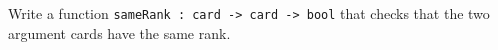 Write a function \lstinline{sameRank : card -> card -> bool} that
checks that the two argument cards have the same rank.
